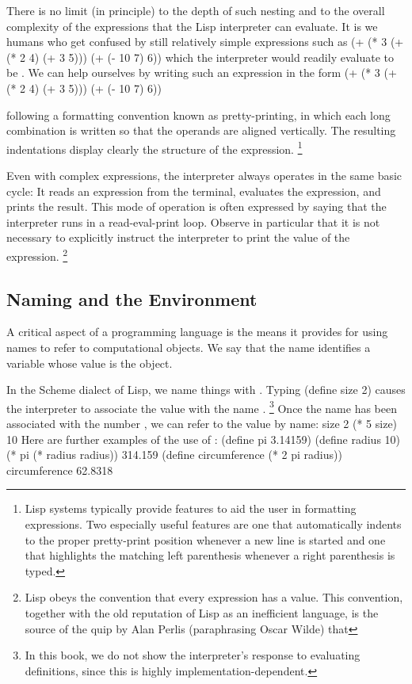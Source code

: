 There is no limit (in principle) to the depth of such nesting
and to the overall complexity of the expressions that the Lisp interpreter can evaluate.
It is we humans who get confused by still relatively simple expressions such as
\startcode
(+ (* 3 (+ (* 2 4) (+ 3 5))) (+ (- 10 7) 6))
\stopcode
which the interpreter would readily evaluate to be .
We can help ourselves by writing such an expression in the form
\startcode
(+ (* 3
      (+ (* 2 4)
         (+ 3 5)))
   (+ (- 10 7)
      6))
\stopcode

following a formatting convention known as pretty-printing,
in which each long combination is written so that the operands are aligned vertically.
The resulting indentations display clearly the structure of the expression.
\footnote{%
   Lisp systems typically provide features to aid the user in formatting expressions.
   Two especially useful features are one that automatically indents to the proper pretty-print position
   whenever a new line is started
   and one that highlights the matching left parenthesis
   whenever a right parenthesis is typed.
}

Even with complex expressions,
the interpreter always operates in the same basic cycle:
It reads an expression from the terminal,
evaluates the expression,
and prints the result.
This mode of operation is often expressed by saying that the interpreter runs in a read-eval-print loop.
Observe in particular that
it is not necessary to explicitly instruct the interpreter to print the value of the expression.
\footnote{%
   Lisp obeys the convention that every expression has a value.
   This convention,
   together with the old reputation of Lisp as an inefficient language,
   is the source of the quip by Alan Perlis (paraphrasing Oscar Wilde)
   that 
}

\subsection{Naming and the Environment}

A critical aspect of a programming language is
the means it provides for using names to refer to computational objects.
We say that the name identifies a variable whose value is the object.

In the Scheme dialect of Lisp, we name things with . Typing
\startcode
(define size 2)
\stopcode
causes the interpreter to associate the value  with the name .
\footnote{%
   In this book,
   we do not show the interpreter's response to evaluating definitions,
   since this is highly implementation-dependent.
}
Once the name  has been associated with the number , we can refer to the value  by name:
\startcode
size
2
(* 5 size)
10
\stopcode
Here are further examples of the use of :
\startcode
(define pi 3.14159)
(define radius 10)
(* pi (* radius radius))
314.159
(define circumference (* 2 pi radius))
circumference
62.8318
\stopcode

